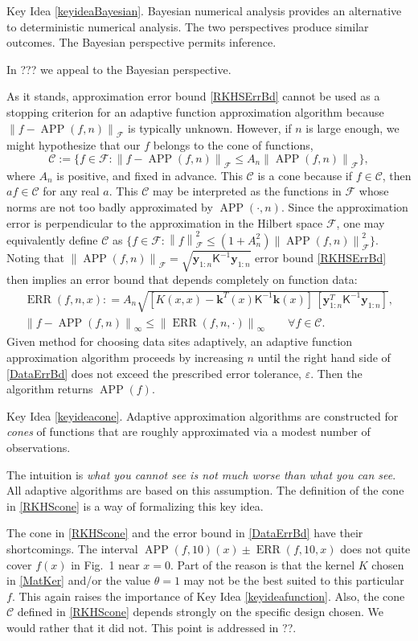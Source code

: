 \documentclass[11pt]{NSFamsart}
\newcommand{\mK}{\mathsf{K}}
\DeclareMathOperator{\APP}{APP}
\DeclareMathOperator{\ERR}{ERR}
\newcommand{\bk}{{\boldsymbol{k}}}
\newcommand{\by}{{\boldsymbol{y}}}
\newcommand{\calc}{{\mathcal{C}}}
\newcommand{\calf}{{\mathcal{F}}}
\newcommand{\norm}[2][{}]{\ensuremath{\left \lVert #2 \right \rVert}_{#1}}
\newcommand{\keyideaBayesiantext}{Bayesian numerical analysis provides an alternative to deterministic numerical analysis.  The two perspectives produce similar outcomes.  The Bayesian perspective permits inference.}
\newcommand{\keyideaconetext}{Adaptive approximation algorithms are constructed for \emph{cones} of functions that are roughly approximated via a modest number of observations.}
\newcommand{\repeatkeyidea}[2]{\begin{itshape}Key Idea \ref{#1}. #2\end{itshape}}
\begin{document}
\repeatkeyidea{keyideaBayesian}{\keyideaBayesiantext}
In ??? we appeal to the Bayesian perspective.

As it stands, approximation error bound \eqref{RKHSErrBd} cannot be used as a stopping criterion for an adaptive function approximation algorithm because $\norm[\calf]{f - \APP(f,n)}$ is typically unknown.  However, if $n$ is large enough, we might hypothesize that our $f$ belongs to the cone of functions,
\begin{equation} \label{RKHScone}
    \calc := \{f \in \calf : \norm[\calf]{f - \APP(f,n)} \le A_n \norm[\calf]{\APP(f,n)} \},
\end{equation}
where $A_n$ is positive, and fixed in advance.  This $\calc$ is a cone because if $f \in \calc$, then $af \in \calc$ for any real $a$.  This $\calc$ may be interpreted as the functions in $\calf$ whose norms are not too badly approximated by $\APP(\cdot,n)$.  Since the approximation error is perpendicular to the approximation in the Hilbert space $\calf$, one may equivalently define $\calc$ as  $\{f \in \calf : \norm[\calf]{f}^2 \le (1 + A_n^2) \norm[\calf]{\APP(f,n)}^2 \}$.  Noting that $\norm[\calf]{\APP(f,n)} = \sqrt{\by_{1:n} \mK^{-1} \by_{1:n}}$ error bound \eqref{RKHSErrBd} then implies an error bound that depends completely on function data: 
\begin{subequations} \label{DataErrBd}
\begin{gather}
    \label{DataErrBda} 
    \ERR(f,n,x) : = A_n \sqrt{[K(x,x) - \bk^T(x) \mK^{-1} \bk(x)] \, [\by_{1:n}^T \mK^{-1} \by_{1:n}] }, \\
    \norm[\infty]{f - \APP(f,n)} \le \norm[\infty]{\ERR(f,n,\cdot)} \qquad \forall f \in \calc.
\end{gather}
\end{subequations}
Given method for choosing data sites adaptively, an adaptive function approximation algorithm proceeds by increasing $n$ until the right hand side of \eqref{DataErrBd} does not exceed the prescribed error tolerance, $\varepsilon$.  Then the algorithm returns $\APP(f)$.

\repeatkeyidea{keyideacone}{\keyideaconetext}
The intuition is \emph{what you cannot see is not much worse than what you can see}. All adaptive algorithms are based on this assumption.  The definition of the cone in \eqref{RKHScone} is a way of formalizing this key idea.

The cone in  \eqref{RKHScone} and the error bound in \eqref{DataErrBd} have their shortcomings. The interval $\APP(f,10)(x) \pm \ERR(f,10,x)$ does not quite cover $f(x)$ in Fig.\ 1 near $x=0$.  Part of the reason is that the kernel $K$ chosen in \eqref{MatKer} and/or the value $\theta =1$ may not be the best suited to this particular $f$.  This again raises the importance of Key Idea \ref{keyideafunction}. Also, the cone $\calc$ defined in  \eqref{RKHScone} depends strongly on the specific design chosen.  We would rather that it did not.  This point is addressed in ??.
\end{document}
